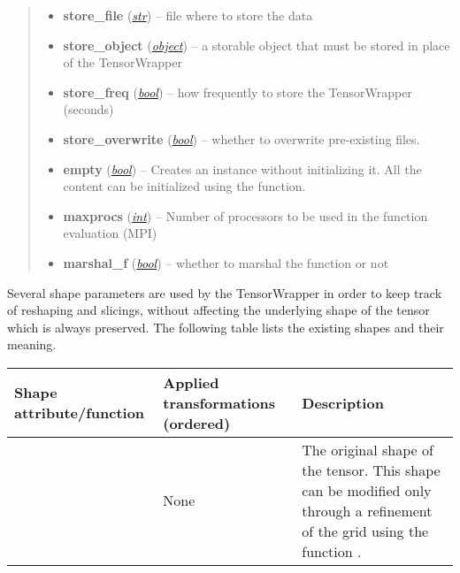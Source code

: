 \documentclass[a4paper,10pt,english]{sphinxmanual}
\begin{document}
\begin{fulllineitems}
\begin{quote}
\begin{description}
\begin{itemize}
\item {} 
\textbf{store\_file} (\href{http://docs.python.org/library/functions.html\#str}{\emph{str}}) -- file where to store the data

\item {} 
\textbf{store\_object} (\href{http://docs.python.org/library/functions.html\#object}{\emph{object}}) -- a storable object that must be stored in place of the TensorWrapper

\item {} 
\textbf{store\_freq} (\href{http://docs.python.org/library/functions.html\#bool}{\emph{bool}}) -- how frequently to store the TensorWrapper (seconds)

\item {} 
\textbf{store\_overwrite} (\href{http://docs.python.org/library/functions.html\#bool}{\emph{bool}}) -- whether to overwrite pre-existing files.

\item {} 
\textbf{empty} (\href{http://docs.python.org/library/functions.html\#bool}{\emph{bool}}) -- Creates an instance without initializing it. All the content can be initialized using the  function.

\item {} 
\textbf{maxprocs} (\href{http://docs.python.org/library/functions.html\#int}{\emph{int}}) -- Number of processors to be used in the function evaluation (MPI)

\item {} 
\textbf{marshal\_f} (\href{http://docs.python.org/library/functions.html\#bool}{\emph{bool}}) -- whether to marshal the function or not

\end{itemize}

\end{description}\end{quote}

Several shape parameters are used by the TensorWrapper in order to keep track of reshaping and slicings, without affecting the underlying shape of the tensor which is always preserved. The following table lists the existing shapes and their meaning.

\begin{tabulary}{\linewidth}{|L|L|L|}
\hline
\textsf{\relax 
Shape attribute/function
} & \textsf{\relax 
Applied transformations (ordered)
} & \textsf{\relax 
Description
}\\
\hline
{}
 & 
None
 & 
The original shape of the tensor. This shape can be modified only  through a refinement of the grid using the function .
\\


\end{tabulary}
\end{fulllineitems}
\end{document}
